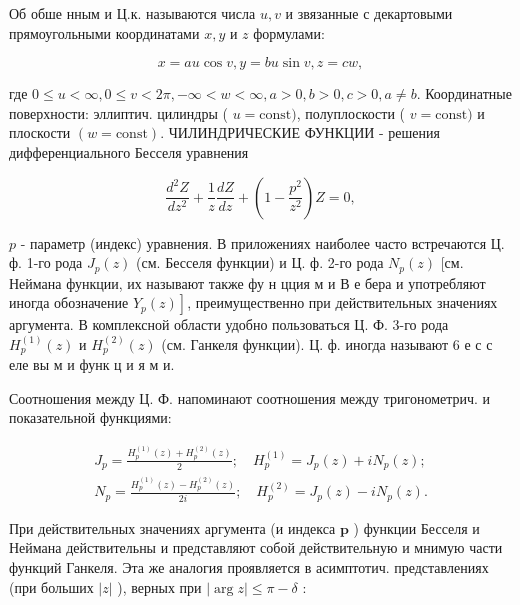 \documentclass[10pt]{article}
\begin{document}
Об обше нным и Ц.к. называются числа $u, v$ и звязанные с декартовыми прямоугольными координатами $x, y$ и $z$ формулами:



\[

x=a u \cos v, y=b u \sin v, z=c w,

\]



где $0 \leqslant u<\infty, 0 \leqslant v<2 \pi,-\infty<w<\infty, a>0, b>0, c>0, a \neq b$. Координатные поверхности: эллиптич. цилиндры ( $u=\mathrm{const})$, полуплоскости ( $v=\mathrm{const})$ и плоскости $(w=\mathrm{const})$. ЧИЛИНДРИЧЕСКИЕ ФУНКЦИИ - решения дифференциального Бесселя уравнения



\[

\frac{d^{2} Z}{d z^{2}}+\frac{1}{z} \frac{d Z}{d z}+\left(1-\frac{p^{2}}{z^{2}}\right) Z=0,

\]



$p$ - параметр (индекс) уравнения. В приложениях наиболее часто встречаются Ц. ф. 1-го рода $J_{p}(z)$ (см. Бесселя функции) и Ц. ф. 2-го рода $N_{p}(z)$ [см. Неймана функции, их называют также фу н цция м и В е бера и употребляют иногда обозначение $\left.Y_{p}(z)\right]$, преимущественно при действительных значениях аргумента. В комплексной области удобно пользоваться Ц. Ф. 3-го рода $H_{p}^{(1)}(z)$ и $H_{p}^{(2)}(z)$ (см. Ганкеля функции). Ц. ф. иногда называют 6 е с с еле вы м и функ ц и я м и.



Соотношения между Ц. Ф. напоминают соотношения между тригонометрич. и показательной функциями:



\[

\begin{array}{ll}

J_{p}=\frac{H_{p}^{(1)}(z)+H_{p}^{(2)}(z)}{2} ; \quad H_{p}^{(1)}=J_{p}(z)+i N_{p}(z) ; \\

N_{p}=\frac{H_{p}^{(1)}(z)-H_{p}^{(2)}(z)}{2 i} ; \quad H_{p}^{(2)}=J_{p}(z)-i N_{p}(z) .

\end{array}

\]



При действительных значениях аргумента (и индекса $\boldsymbol{p}$ ) функции Бесселя и Неймана действительны и представляют собой действительную и мнимую части функций Ганкеля. Эта же аналогия проявляется в асимптотич. представлениях (при больших $|z|$ ), верных при $|\arg z| \leqslant \pi-\delta$ :
\end{document}
